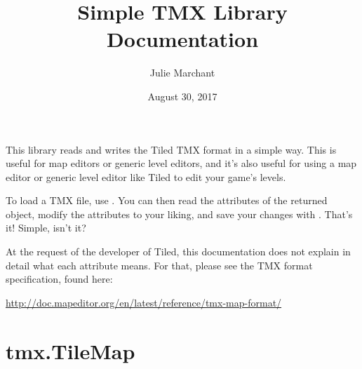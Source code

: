 \documentclass[letterpaper,10pt,english]{sphinxmanual}
\title{Simple TMX Library Documentation}
\date{August 30, 2017}
\author{Julie Marchant}
\begin{document}
\maketitle
\tableofcontents
{}\label{index::doc}

\label{index:module-tmx}
This library reads and writes the Tiled TMX format in a simple way.
This is useful for map editors or generic level editors, and it's also
useful for using a map editor or generic level editor like Tiled to edit
your game's levels.

To load a TMX file, use {\hyperref[index:tmx.TileMap.load]{\emph{}}}.  You can then read the
attributes of the returned {\hyperref[index:tmx.TileMap]{\emph{}}} object, modify the
attributes to your liking, and save your changes with
{\hyperref[index:tmx.TileMap.save]{\emph{}}}.  That's it!  Simple, isn't it?

At the request of the developer of Tiled, this documentation does not
explain in detail what each attribute means. For that, please see the
TMX format specification, found here:

\href{http://doc.mapeditor.org/en/latest/reference/tmx-map-format/}{http://doc.mapeditor.org/en/latest/reference/tmx-map-format/}


\chapter{tmx.TileMap}
\label{index:tmx-tilemap}\label{index:simple-tmx-library-documentation}
\end{document}
